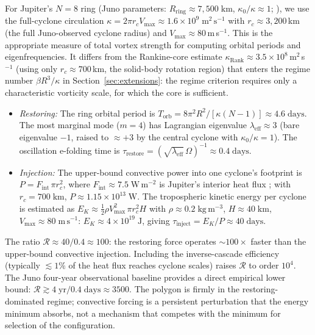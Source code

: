 For Jupiter's $N=8$ ring (Juno parameters: $R_{\mathrm{ring}}\approx
7{,}500\;\mathrm{km}$, $\kappa_0/\kappa \approx 1$;
\citealt{Adriani2018}), we use the full-cyclone circulation
$\kappa = 2\pi r_c V_{\max} \approx 1.6\times10^9\;\mathrm{m^2\,s^{-1}}$
with $r_c\approx3{,}200$\,km (the full Juno-observed cyclone radius)
and $V_{\max}\approx80$\,m\,s$^{-1}$.  This is the appropriate measure
of total vortex strength for computing orbital periods and eigenfrequencies.
It differs from the Rankine-core estimate
$\kappa_{\mathrm{Rank}}\approx3.5\times10^8$\,m$^2$\,s$^{-1}$
(using only $r_c\approx700$\,km, the solid-body rotation region)
that enters the regime number $\beta R^3/\kappa$ in
Section~\ref{sec:extensions}: the regime criterion requires only a
characteristic vorticity scale, for which the core is sufficient.
\begin{itemize}
\item \emph{Restoring:} The ring orbital period is $T_{\mathrm{orb}} =
  8\pi^2 R^2/[\kappa(N{-}1)] \approx 4.6\;\mathrm{days}$.
  The most marginal mode ($m=4$) has Lagrangian eigenvalue
  $\lambda_{\mathrm{eff}} \approx 3$ (bare eigenvalue $-1$, raised to
  $\approx+3$ by the central cyclone with $\kappa_0/\kappa=1$).
  The oscillation e-folding time is
  $\tau_{\mathrm{restore}} = (\sqrt{\lambda_{\mathrm{eff}}}\,\Omega)^{-1}
  \approx 0.4\;\mathrm{days}$.

\item \emph{Injection:} The upper-bound convective power into one
  cyclone's footprint is $P = F_{\mathrm{int}}\,\pi r_c^2$, where
  $F_{\mathrm{int}} \approx 7.5\;\mathrm{W\,m^{-2}}$ is Jupiter's
  interior heat flux \citep{Guillot2005}; with $r_c = 700\;\mathrm{km}$,
  $P \approx 1.15\times10^{13}\;\mathrm{W}$.
  The tropospheric kinetic energy per cyclone is estimated as
  $E_K \approx \tfrac{1}{2}\rho V_{\max}^2\,\pi r_c^2 H$
  with $\rho \approx 0.2\;\mathrm{kg\,m^{-3}}$, $H \approx 40\;\mathrm{km}$,
  $V_{\max} \approx 80\;\mathrm{m\,s^{-1}}$:
  $E_K \approx 4\times 10^{19}\;\mathrm{J}$, giving
  $\tau_{\mathrm{inject}} = E_K/P \approx 40\;\mathrm{days}$.
\end{itemize}
The ratio $\mathcal{R} \approx 40/0.4 \approx 100$: the restoring force
operates $\sim\!100\times$ faster than the upper-bound convective
injection.  Including the inverse-cascade efficiency (typically
$\lesssim 1\%$ of the heat flux reaches cyclone scales) raises
$\mathcal{R}$ to order $10^4$.  The Juno four-year observational
baseline provides a direct empirical lower bound:
$\mathcal{R} \gtrsim 4\;\mathrm{yr}/0.4\;\mathrm{days} \approx 3500$.
The polygon is firmly in the restoring-dominated regime; convective
forcing is a persistent perturbation that the energy minimum absorbs,
not a mechanism that competes with the minimum for selection of the
configuration.

